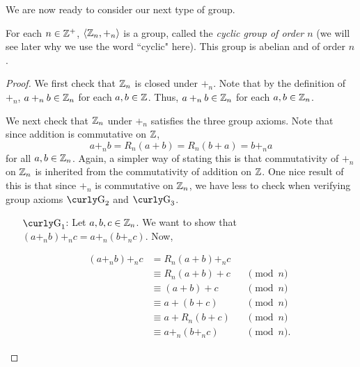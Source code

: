 \bigskip
{}


 We are now ready to consider our next type of group.

\begin{example}{} For each $n\in \mathbb{Z}^+$, $\langle\mathbb{Z}_n,+_n\rangle$ is a group, called the \textit{cyclic group of order $n$} (we will see later why we use the word ``cyclic" here).
This group is abelian and of order $n$.

\begin{proof} We first check that $\mathbb{Z}_n$ is closed under $+_n$. Note
that by the definition of $+_n$, $a+_nb \in \mathbb{Z}_n$ for each
$a,b\in \mathbb{Z}$.  Thus, $a+_nb \in \mathbb{Z}_n$ for each $a,b\in \mathbb{Z}_n$.

We next check that $\mathbb{Z}_n$ under $+_n$ satisfies the three group
axioms. Note that since addition is commutative on $\mathbb{Z}$, $$a+_n
b =R_n(a+b)=R_n(b+a)=b+_n a$$ for all $a,b\in \mathbb{Z}_n$. Again, a
simpler way of stating this is that commutativity of $+_n$ on
$\mathbb{Z}_n$ is inherited from the commutativity of addition on $\mathbb{Z}$.
One nice result of this is that since $+_n$ is commutative on
$\mathbb{Z}_n$, we have less to check when verifying group axioms
$\G_2$ and $\G_3$.

\begin{enumerate}
\item[$\G_1$:]  Let $a,b,c\in \mathbb{Z}_n$.  We want to show that
    $(a+_n b)+_n c = a +_n(b+_n c)$. Now,

\begin{align*}
(a+_n b)+_n c&=R_n(a+b)+_n c&&\\
&\equiv R_n(a+b)+c&& \pmod n \\
&\equiv (a+b)+c&&  \pmod n\\
&\equiv a+(b+c)&&  \pmod n\\
&\equiv a+R_n(b+c)&&  \pmod n \\
&\equiv a+_n (b+_n c)&& \pmod n.
\end{align*}



\end{enumerate}
\end{proof}
\end{example}
